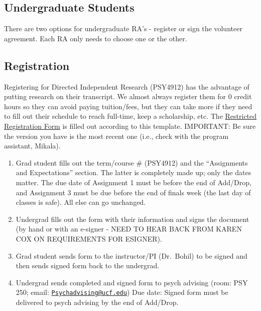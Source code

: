 \documentclass[
]{book}
\providecommand{\tightlist}{%
  \setlength{\itemsep}{0pt}\setlength{\parskip}{0pt}}
\begin{document}
\hypertarget{undergraduate-students}{%
\subsection{Undergraduate Students}\label{undergraduate-students}}

There are two options for undergraduate RA's - register or sign the volunteer agreement. Each RA only needs to choose one or the other.

\hypertarget{registration}{%
\subsection{Registration}\label{registration}}

Registering for Directed Independent Research (PSY4912) has the advantage of putting research on their transcript. We almost always register them for 0 credit hours so they can avoid paying tuition/fees, but they can take more if they need to fill out their schedule to reach full-time, keep a scholarship, etc. The \href{docs/resources/Undergraduate\%20Registration\%20Agreement\%20Summer\%202020.pdf}{Restricted Registration Form} is filled out according to this template. IMPORTANT: Be sure the version you have is the most recent one (i.e., check with the program assistant, Mikala).

\begin{enumerate}
\def\labelenumi{\arabic{enumi}.}
\tightlist
\item
  Grad student fills out the term/course \# (PSY4912) and the ``Assignments and Expectations'' section. The latter is completely made up; only the dates matter. The due date of Assignment 1 must be before the end of Add/Drop, and Assignment 3 must be due before the end of finals week (the last day of classes is safe). All else can go unchanged.
\item
  Undergrad fills out the form with their information and signs the document (by hand or with an e-signer - NEED TO HEAR BACK FROM KAREN COX ON REQUIREMENTS FOR ESIGNER).
\item
  Grad student sends form to the instructor/PI (Dr.~Bohil) to be signed and then sends signed form back to the undergrad.
\item
  Undergrad sends completed and signed form to psych advising (room: PSY 250; email: \href{mailto:Psychadvising@ucf.edu}{\nolinkurl{Psychadvising@ucf.edu}})
  Due date: Signed form must be delivered to psych advising by the end of Add/Drop.
\end{enumerate}
\end{document}
